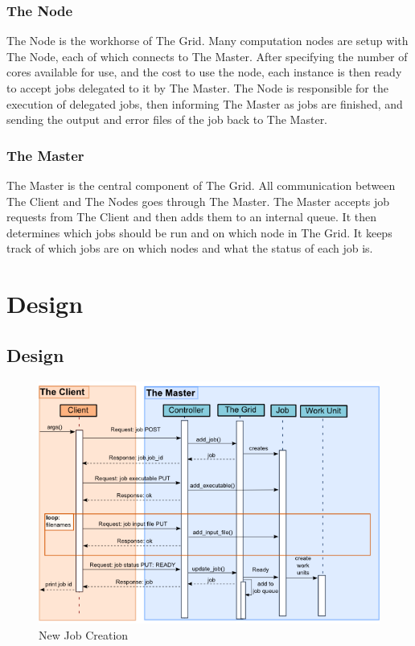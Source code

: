 \section{The Node}
\label{thenode}

The Node is the workhorse of The Grid. Many computation nodes are setup with The Node, each of which connects to The Master. After specifying the number of cores available for use, and the cost to use the node, each instance is then ready to accept jobs delegated to it by The Master. The Node is responsible for the execution of delegated jobs, then informing The Master as jobs are finished, and sending the output and error files of the job back to The Master.

\section{The Master}
\label{themaster}

The Master is the central component of The Grid. All communication between The Client and The Nodes goes through The Master. The Master accepts job requests from The Client and then adds them to an internal queue. It then determines which jobs should be run and on which node in The Grid. It keeps track of which jobs are on which nodes and what the status of each job is. 

\part{Design}
\label{design}

\chapter{Design}
\label{design}

\begin{figure}[htbp]
\centering
\includegraphics[keepaspectratio,width=\textwidth,height=0.75\textheight]{./figs/jobcreate.png}
\caption{New Job Creation}
\end{figure}


